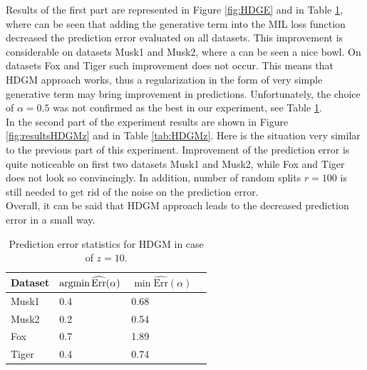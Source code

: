 Results of the first part are represented in Figure \ref{fig:HDGE} and in Table \ref{tab:resultsHDGE}, where can be seen that adding the generative term into the MIL loss function decreased the prediction error evaluated on all datasets. This improvement is considerable on datasets Musk1 and Musk2, where a can be seen a nice bowl. On datasets Fox and Tiger such improvement does not occur. This means that HDGM approach works, thus a regularization in the form of very simple generative term may bring improvement in predictions. Unfortunately, the choice of $\alpha=0.5$ was not confirmed as the best in our experiment, see Table \ref{tab:resultsHDGE}.   \\
In the second part of the experiment results are shown in Figure \ref{fig:resultsHDGMz} and in Table \ref{tab:HDGMz}. Here is the situation very similar to the previous part of this experiment. Improvement of the prediction error is quite noticeable on first two datasets Musk1 and Musk2, while Fox and Tiger does not look so convincingly. In addition, number of random splits $r=100$ is still needed to get rid of the noise on the prediction error. \\
Overall, it can be said that HDGM approach leads to the decreased prediction error in a small way. 
\begin{table}[h]
	\centering
	\begin{tabular}{|l|l|l|l|}
		\hline
		Dataset  &  $\mathop{\mathrm{argmin}} \widehat{\mathrm{Err}}(\alpha)$& $\min \widehat{\mathrm{Err}}(\alpha)$ \\ \hline
		Musk1              & 0.4      & 0.68   \\ \hline
		Musk2             & 0.2      & 0.54   \\ \hline
		Fox                 & 0.7      & 1.89  \\ \hline
		Tiger            & 0.4      & 0.74      \\ \hline
	\end{tabular}
	\caption{Prediction error statistics for HDGM in case of $z=10$.}
	\label{tab:resultsHDGE}
\end{table}
